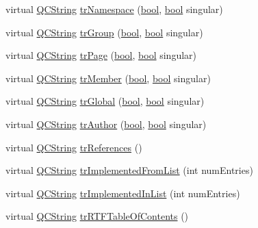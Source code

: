 \begin{DoxyCompactItemize}
virtual \hyperlink{class_q_c_string}{Q\+C\+String} \hyperlink{class_translator_korean_aa12d74e00aee44683191bb6f0e20b50d}{tr\+Namespace} (\hyperlink{qglobal_8h_a1062901a7428fdd9c7f180f5e01ea056}{bool}, \hyperlink{qglobal_8h_a1062901a7428fdd9c7f180f5e01ea056}{bool} singular)
\item 
virtual \hyperlink{class_q_c_string}{Q\+C\+String} \hyperlink{class_translator_korean_abb8abbd3d17b2c6b9052eb9dc1ba31f0}{tr\+Group} (\hyperlink{qglobal_8h_a1062901a7428fdd9c7f180f5e01ea056}{bool}, \hyperlink{qglobal_8h_a1062901a7428fdd9c7f180f5e01ea056}{bool} singular)
\item 
virtual \hyperlink{class_q_c_string}{Q\+C\+String} \hyperlink{class_translator_korean_a25d4e603ab21d42defd20e0caf6932cf}{tr\+Page} (\hyperlink{qglobal_8h_a1062901a7428fdd9c7f180f5e01ea056}{bool}, \hyperlink{qglobal_8h_a1062901a7428fdd9c7f180f5e01ea056}{bool} singular)
\item 
virtual \hyperlink{class_q_c_string}{Q\+C\+String} \hyperlink{class_translator_korean_a7de68f427722af2148122f7863b099d2}{tr\+Member} (\hyperlink{qglobal_8h_a1062901a7428fdd9c7f180f5e01ea056}{bool}, \hyperlink{qglobal_8h_a1062901a7428fdd9c7f180f5e01ea056}{bool} singular)
\item 
virtual \hyperlink{class_q_c_string}{Q\+C\+String} \hyperlink{class_translator_korean_a825ad7820d84629c6c64aeaceb38ac88}{tr\+Global} (\hyperlink{qglobal_8h_a1062901a7428fdd9c7f180f5e01ea056}{bool}, \hyperlink{qglobal_8h_a1062901a7428fdd9c7f180f5e01ea056}{bool} singular)
\item 
virtual \hyperlink{class_q_c_string}{Q\+C\+String} \hyperlink{class_translator_korean_a7a9cc0313f8ad406e6339ea01dd05562}{tr\+Author} (\hyperlink{qglobal_8h_a1062901a7428fdd9c7f180f5e01ea056}{bool}, \hyperlink{qglobal_8h_a1062901a7428fdd9c7f180f5e01ea056}{bool} singular)
\item 
virtual \hyperlink{class_q_c_string}{Q\+C\+String} \hyperlink{class_translator_korean_a3364d5730272c08985751784a44eb24b}{tr\+References} ()
\item 
virtual \hyperlink{class_q_c_string}{Q\+C\+String} \hyperlink{class_translator_korean_a15af8276ab99323b2c70e06b39c2fa7a}{tr\+Implemented\+From\+List} (int num\+Entries)
\item 
virtual \hyperlink{class_q_c_string}{Q\+C\+String} \hyperlink{class_translator_korean_a06804d4e2253eea63c74f45109aec2ee}{tr\+Implemented\+In\+List} (int num\+Entries)
\item 
virtual \hyperlink{class_q_c_string}{Q\+C\+String} \hyperlink{class_translator_korean_a283fcda4bac83cc8d6726cc68d50e524}{tr\+R\+T\+F\+Table\+Of\+Contents} ()

\end{DoxyCompactItemize}
